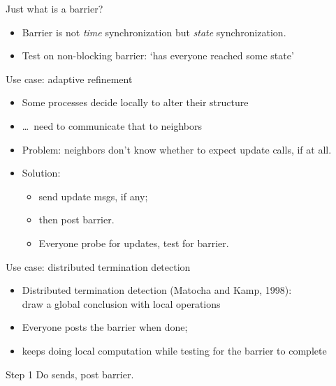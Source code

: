 
\begin{numberedframe}{Just what is a barrier?}
  \begin{itemize}
  \item Barrier is not \emph{time} synchronization but \emph{state}
    synchronization.
  \item Test on non-blocking barrier: `has everyone reached some
    state'
  \end{itemize}
\end{numberedframe}

\begin{numberedframe}{Use case: adaptive refinement}
  \begin{itemize}
  \item Some processes decide locally to alter their structure
  \item \ldots~need to communicate that to neighbors
  \item Problem: neighbors don't know whether to expect update calls,
    if at all.
  \item Solution:
    \begin{itemize}
    \item send update msgs, if any;
    \item then post barrier.
    \item Everyone probe for updates, test for barrier.    
    \end{itemize}
  \end{itemize}
\end{numberedframe}

\begin{numberedframe}{Use case: distributed termination detection}
  \begin{itemize}
  \item Distributed termination detection (Matocha and Kamp, 1998):\\
    draw a global conclusion with local operations
  \item Everyone posts the barrier when done;
  \item keeps doing local computation while testing for the barrier to
    complete
  \end{itemize}
\end{numberedframe}


\begin{numberedframe}{Step 1}
  Do sends, post barrier.
\end{numberedframe}

